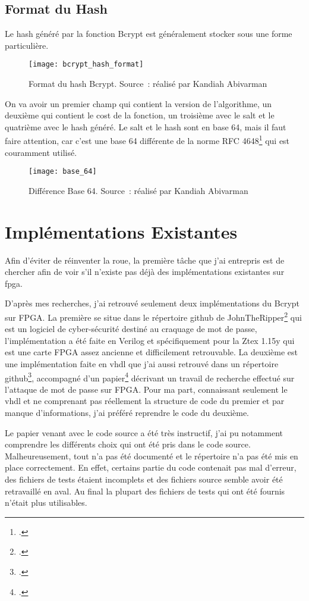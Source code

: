 \subsection{Format du Hash}

Le hash généré par la fonction Bcrypt est généralement stocker sous une forme particulière. 

\begin{figure}[tbph!]
	\centering
	\texttt{[image: bcrypt\_hash\_format]}
	\caption[Format du hash Bcrypt]{Format du hash Bcrypt. Source : réalisé par Kandiah Abivarman}
	\label{fig:bcrypt_hash_format}
\end{figure}

On va avoir un premier champ qui contient la version de l'algorithme, un deuxième qui contient le cost de la fonction, un troisième avec le salt et le quatrième avec le hash généré. 
Le salt et le hash sont en base 64, mais il faut faire attention, car c'est une base 64 différente de la norme RFC 4648\footcite{josefsson_base16_2006} qui est couramment utilisé.

\begin{figure}[tbph!]
	\centering
	\texttt{[image: base\_64]}
	\caption[Différence Base 64]{Différence Base 64. Source : réalisé par Kandiah Abivarman}
	\label{fig:base_64}
\end{figure}

\section{Implémentations Existantes}

Afin d'éviter de réinventer la roue, la première tâche que j'ai entrepris est de chercher afin de voir s'il n'existe pas déjà des implémentations existantes sur \gls{fpga}. 

D'après mes recherches, j'ai retrouvé seulement deux implémentations du Bcrypt sur FPGA. 
La première se situe dans le répertoire github de JohnTheRipper\footcite{noauthor_openwalljohn_2024} qui est un logiciel de cyber-sécurité destiné au craquage de mot de passe, l'implémentation a été faite en Verilog et spécifiquement pour la Ztex 1.15y qui est une carte FPGA assez ancienne et difficilement retrouvable. 
La deuxième est une implémentation faite en \gls{vhdl} que j'ai aussi retrouvé dans un répertoire github\footcite{noauthor_rub-hgihigh-speed_bcrypt_nodate}, accompagné d'un papier\footcite{wiemer_high-speed_2014} décrivant un travail de recherche effectué sur l'attaque de mot de passe sur FPGA. 
Pour ma part, connaissant seulement le \gls{vhdl} et ne comprenant pas réellement la structure de code du premier et par manque d'informations, j'ai préféré reprendre le code du deuxième. 

Le papier venant avec le code source a été très instructif, j'ai pu notamment comprendre les différents choix qui ont été pris dans le code source. 
Malheureusement, tout n'a pas été documenté et le répertoire n'a pas été mis en place correctement. 
En effet, certains partie du code contenait pas mal d'erreur, des fichiers de tests étaient incomplets et des fichiers source semble avoir été retravaillé en aval.
Au final la plupart des fichiers de tests qui ont été fournis n'était plus utilisables.